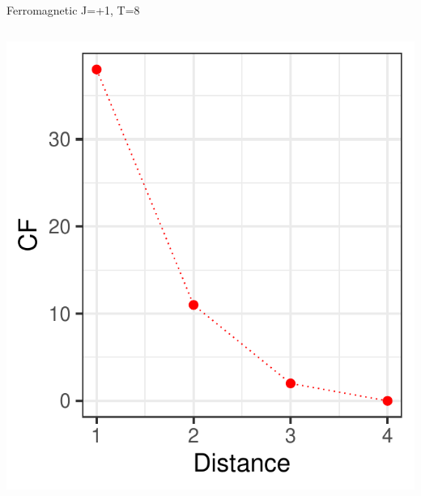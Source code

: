 \documentclass{beamer}
\begin{document}
\begin{frame}{Ferromagnetic J=+1, T=8}
\begin{columns}
\begin{column}{0.5\textwidth}
\begin{center}
     \includegraphics[width=\textwidth]{Pic/J+1_10_6000_T=8_Coherence.pdf}
     \end{center}
\end{column}
\end{columns}
\end{frame}
\end{document}
